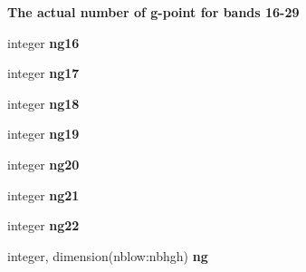 \begin{Indent}\textbf{ The actual number of g-\/point for bands 16-\/29}\par
\begin{DoxyCompactItemize}
\item 
\mbox{\label{namespacemodule__radsw__parameters_a442b3758f00a388cd8b7129ba910942a}} 
integer {\bfseries ng16}
\item 
\mbox{\label{namespacemodule__radsw__parameters_af1f90ffe5780463d1e2edbe0e8dfd1f9}} 
integer {\bfseries ng17}
\item 
\mbox{\label{namespacemodule__radsw__parameters_ac00a8e59e4f7e584af9b453c2c9fe35d}} 
integer {\bfseries ng18}
\item 
\mbox{\label{namespacemodule__radsw__parameters_ab3551e23105cd3515e887e877407dc39}} 
integer {\bfseries ng19}
\item 
\mbox{\label{namespacemodule__radsw__parameters_a1619a2243f1cb29e4393598fa0bc4c8f}} 
integer {\bfseries ng20}
\item 
\mbox{\label{namespacemodule__radsw__parameters_ab029caf0ee0c1195539643bef00e0598}} 
integer {\bfseries ng21}
\item 
\mbox{\label{namespacemodule__radsw__parameters_a655c1f742fc97d58c32131e8a85cb6fd}} 
integer {\bfseries ng22}
\item 
\mbox{\label{namespacemodule__radsw__parameters_aff9670cd3f5bef92ca998e491e28986e}} 
integer, dimension(nblow\+:nbhgh) {\bfseries ng}
\end{DoxyCompactItemize}
\end{Indent}
